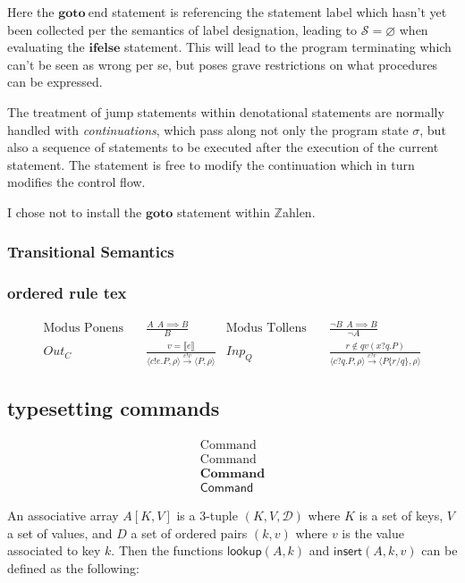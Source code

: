 \documentclass{article}
\begin{document}
	Here the $\mathbf{goto} \ \text{end}$ statement is referencing the statement label  which hasn't yet been collected per the semantics of label designation, leading to $\mathcal{S} = \varnothing$ when evaluating the $\mathbf{ifelse}$ statement. This will lead to the program terminating which can't be seen as wrong per se, but poses grave restrictions on what procedures can be expressed.
	
	The treatment of jump statements within denotational statements are normally handled with \emph{continuations}, which pass along not only the program state $\sigma$, but also a sequence of statements to be executed after the execution of the current statement. The statement is free to modify the continuation which in turn modifies the control flow.
	
	I chose not to install the $\mathbf{goto}$ statement within $\mathbb{Z}$ahlen.
	
	\subsubsection{Transitional Semantics}
	
	\subsubsection{ordered rule tex}
	
	\begin{align*}
		\text{Modus Ponens} & \quad \frac{A \ \ A \implies B}{B} 
		&  \text{Modus Tollens} & \quad \frac{\neg B \ \ A \implies B}{\neg A} \\
		Out_{C} & \quad\frac{v = \llbracket e\rrbracket}{\langle c!e.P,\rho\rangle\xrightarrow{e!v}\langle P,\rho\rangle} & Inp_{Q} & \quad\frac{r\not\in qv(x?q.P)}{\langle c?q.P,\rho\rangle\xrightarrow{c?r}\langle P\{r/q\},\rho\rangle}
	\end{align*}
	
	\subsection{typesetting commands}
	
	\begin{align*}
		\text{Command} \\
		\mathrm{Command} \\
		\mathbf{Command} \\
		\mathsf{Command}
	\end{align*}
	
	An associative array $A[K, V]$ is a 3-tuple $(K, V, \mathcal{D})$ where $K$ is a set of keys, $V$ a set of values, and $D$ a set of ordered pairs $(k, v)$ where $v$ is the value associated to key $k$. Then the functions $\mathsf{lookup}(A, k)$ and $\mathsf{insert}(A, k, v)$ can be defined as the following:
	
\end{document}
